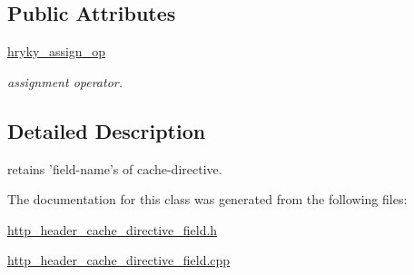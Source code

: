 \subsection*{Public Attributes}
\begin{DoxyCompactItemize}
\item 
\hypertarget{classhryky_1_1http_1_1header_1_1cache_1_1directive_1_1_field_af3de1ee674047fefb33cedf738e0f419}{\hyperlink{classhryky_1_1http_1_1header_1_1cache_1_1directive_1_1_field_af3de1ee674047fefb33cedf738e0f419}{hryky\-\_\-assign\-\_\-op}}\label{classhryky_1_1http_1_1header_1_1cache_1_1directive_1_1_field_af3de1ee674047fefb33cedf738e0f419}

\begin{DoxyCompactList}\small\item\em assignment operator. \end{DoxyCompactList}\end{DoxyCompactItemize}


\subsection{Detailed Description}
retains 'field-\/name's of cache-\/directive. 

The documentation for this class was generated from the following files\-:\begin{DoxyCompactItemize}
\item 
\hyperlink{http__header__cache__directive__field_8h}{http\-\_\-header\-\_\-cache\-\_\-directive\-\_\-field.\-h}\item 
\hyperlink{http__header__cache__directive__field_8cpp}{http\-\_\-header\-\_\-cache\-\_\-directive\-\_\-field.\-cpp}\end{DoxyCompactItemize}
